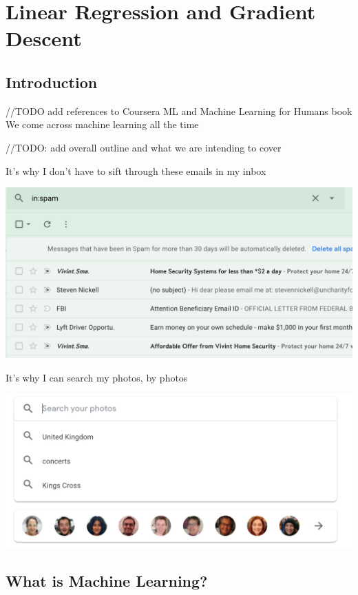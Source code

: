 \documentclass[12pt]{article}
\begin{document}
\section{Linear Regression and Gradient Descent}
\subsection{Introduction}

//TODO add references to Coursera ML and Machine Learning for Humans book
We come across  machine learning all the time 

//TODO: add overall outline and what we are intending to cover

It's why I don't have to sift through these emails in my inbox

\includegraphics[width=\textwidth]{spam}

It's why I can search my photos, by photos

\includegraphics[width=\textwidth]{photo-search}

\subsection{What is Machine Learning?}
\end{document}
